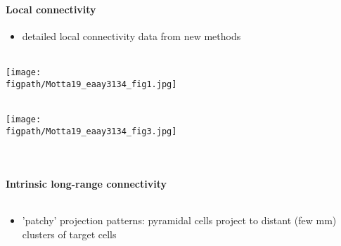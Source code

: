 \documentclass[8pt,t,usepdftitle=false]{beamer}
\def\figpath{\src/figures}
\begin{document}
\begin{frame}[plain]
  \frametitle{\ttl}
  \framesubtitle{Local connectivity}
  \begin{itemize}
  \item detailed local connectivity data from new methods
  \end{itemize}
  \vspace{2ex}
  \parbox{\linewidth}{
    \parbox[t]{0.55\linewidth}{
      \ \\
      \texttt{[image: \\figpath/Motta19\_eaay3134\_fig1.jpg]}
    }%
    \hfill
    \parbox[t]{0.44\linewidth}{
      \ \\
      \texttt{[image: \\figpath/Motta19\_eaay3134\_fig3.jpg]}
    }\\        
      }
\end{frame}
\begin{frame}[plain]
  \frametitle{\ttl}
  \framesubtitle{Intrinsic long-range connectivity}
  \vspace*{-2ex}
  \begin{columns}
    \begin{column}{0.5\linewidth}
      \begin{itemize}
      \item 'patchy' projection patterns:
        pyramidal cells project to distant (few mm) clusters
        of target cells
      \end{itemize}
    \end{column}
    \begin{column}{0.5\linewidth}
    \end{column}
  \end{columns}
\end{frame}
\end{document}
